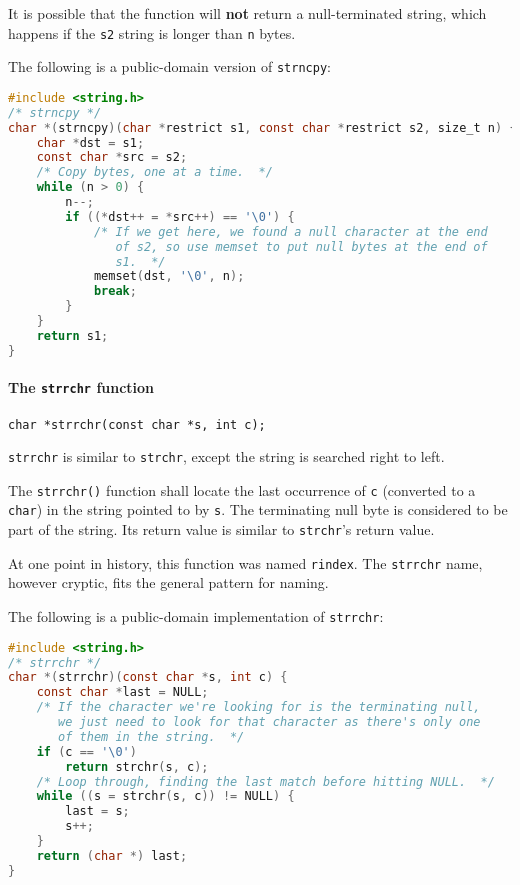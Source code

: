 It is possible that the function will \textbf{not} return a null-terminated
string, which happens if the \texttt{s2} string is longer than \texttt{n}
bytes.

The following is a public-domain version of \texttt{strncpy}:
\lstset{basicstyle=\scriptsize, numbers=left, captionpos=b, tabsize=4}
\begin{lstlisting}[caption=Section \thesection listing \arabic{stringcnt},language={C},
breaklines=true,xleftmargin=15pt,label=lst:section\thesection listing\arabic{stringcnt}]
#include <string.h>
/* strncpy */
char *(strncpy)(char *restrict s1, const char *restrict s2, size_t n) {
	char *dst = s1;
	const char *src = s2;
	/* Copy bytes, one at a time.  */
	while (n > 0) {
		n--;
		if ((*dst++ = *src++) == '\0') {
			/* If we get here, we found a null character at the end
			   of s2, so use memset to put null bytes at the end of
			   s1.  */
			memset(dst, '\0', n);
			break;
		}
	}
	return s1;
}
\end{lstlisting}

\paragraph{The \texttt{strrchr} function}
\texttt{char *strrchr(const char *s, int c);}

\texttt{strrchr} is similar to \texttt{strchr}, except the string is searched
right to left.

The \texttt{strrchr()} function shall locate the last occurrence of \texttt{c}
(converted to a \texttt{char}) in the string pointed to by \texttt{s}. The
terminating null byte is considered to be part of the string. Its return value
is similar to \texttt{strchr}'s return value.

At one point in history, this function was named \texttt{rindex}. The
\texttt{strrchr} name, however cryptic, fits the general pattern for naming.

The following is a public-domain implementation of \texttt{strrchr}:
\lstset{basicstyle=\scriptsize, numbers=left, captionpos=b, tabsize=4}
\begin{lstlisting}[caption=Section \thesection listing \arabic{stringcnt},language={C},
breaklines=true,xleftmargin=15pt,label=lst:section\thesection listing\arabic{stringcnt}]
#include <string.h>
/* strrchr */
char *(strrchr)(const char *s, int c) {
	const char *last = NULL;
	/* If the character we're looking for is the terminating null,
	   we just need to look for that character as there's only one
	   of them in the string.  */
	if (c == '\0')
		return strchr(s, c);
	/* Loop through, finding the last match before hitting NULL.  */
	while ((s = strchr(s, c)) != NULL) {
		last = s;
		s++;
	}
	return (char *) last;
}
\end{lstlisting}

